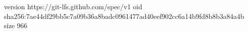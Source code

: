 version https://git-lfs.github.com/spec/v1
oid sha256:7ae44df29bb5c7a09b36a8badc0961477ad40eef902cc6a14b9fd8b8b3a84a4b
size 966
